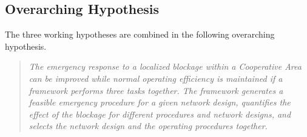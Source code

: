 \documentclass[11pt,letterpaper]{article}
\begin{document}
\subsection{Overarching Hypothesis}
\label{sec:overarching-hypothesis}

The three working hypotheses are combined in the following overarching hypothesis.

\begin{quote}
\textit{The emergency response to a localized blockage within a Cooperative Area can be improved while normal operating efficiency is maintained if a framework performs three tasks together. The framework generates a feasible emergency procedure for a given network design, quantifies the effect of the blockage for different procedures and network designs, and selects the network design and the operating procedures together.}
\end{quote}
\end{document}
